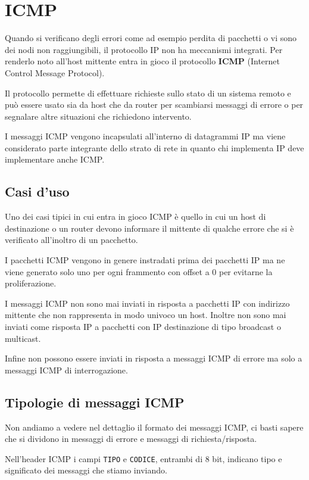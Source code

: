 \section{ICMP}
Quando si verificano degli errori come ad esempio perdita di pacchetti
o vi sono dei nodi non raggiungibili, il protocollo IP non ha 
meccanismi integrati. Per renderlo noto all'host mittente entra in 
gioco il protocollo \textbf{ICMP} (Internet Control Message Protocol).

Il protocollo permette di effettuare richieste sullo stato di un 
sistema remoto e può essere usato sia da host che da router per 
scambiarsi messaggi di errore o per segnalare altre situazioni che 
richiedono intervento.

I messaggi ICMP vengono incapsulati all'interno di datagrammi IP ma
viene considerato parte integrante dello strato di rete in quanto chi
implementa IP deve implementare anche ICMP.

\subsection{Casi d'uso}
Uno dei casi tipici in cui entra in gioco ICMP è quello in cui un host
di destinazione o un router devono informare il mittente di qualche
errore che si è verificato all'inoltro di un pacchetto.

I pacchetti ICMP vengono in genere instradati prima dei pacchetti IP
ma ne viene generato solo uno per ogni frammento con offset a 0 per
evitarne la proliferazione.

I messaggi ICMP non sono mai inviati in risposta a pacchetti IP con 
indirizzo mittente che non rappresenta in modo univoco un host.
Inoltre non sono mai inviati come risposta IP a pacchetti con IP
destinazione di tipo broadcast o multicast.

Infine non possono essere inviati in risposta a messaggi ICMP di errore
ma solo a messaggi ICMP di interrogazione.

\subsection{Tipologie di messaggi ICMP}
Non andiamo a vedere nel dettaglio il formato dei messaggi ICMP, ci
basti sapere che si dividono in messaggi di errore e messaggi di 
richiesta/risposta.

Nell'header ICMP i campi \verb|TIPO| e \verb|CODICE|, entrambi di 8
bit, indicano tipo e significato dei messaggi che stiamo inviando.

